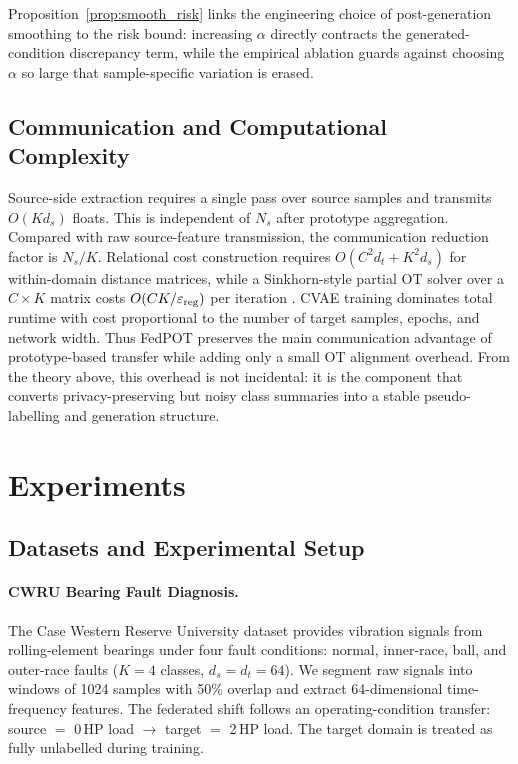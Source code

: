 \documentclass[a4paper,fleqn]{cas-sc}
\begin{document}
Proposition~\ref{prop:smooth_risk} links the engineering choice of
post-generation smoothing to the risk bound: increasing $\alpha$ directly
contracts the generated-condition discrepancy term, while the empirical
ablation guards against choosing $\alpha$ so large that sample-specific
variation is erased.

\subsection{Communication and Computational Complexity}

Source-side extraction requires a single pass over source samples and
transmits $O(Kd_s)$ floats. This is independent of $N_s$ after prototype
aggregation. Compared with raw source-feature transmission, the communication
reduction factor is $N_s/K$. Relational cost construction requires
$O(C^2d_t+K^2d_s)$ for within-domain distance matrices, while a Sinkhorn-style
partial OT solver over a $C\times K$ matrix costs $O(CK/\varepsilon_{\rm reg})$
per iteration \citep{Cuturi2013}. CVAE training dominates total runtime with
cost proportional to the number of target samples, epochs, and network width.
Thus FedPOT preserves the main communication advantage of prototype-based
transfer while adding only a small OT alignment overhead. From the theory
above, this overhead is not incidental: it is the component that converts
privacy-preserving but noisy class summaries into a stable pseudo-labelling
and generation structure.

\section{Experiments}
\label{sec:exp}

\subsection{Datasets and Experimental Setup}
\label{sec:data}

\paragraph{CWRU Bearing Fault Diagnosis.}
The Case Western Reserve University dataset \citep{Smith2015} provides
vibration signals from rolling-element bearings under four fault conditions:
normal, inner-race, ball, and outer-race faults ($K=4$ classes, $d_s=d_t=64$).
We segment raw signals into windows of 1024 samples with 50\% overlap
and extract 64-dimensional time-frequency features.
The federated shift follows an operating-condition transfer:
source $=$ 0\,HP load $\to$ target $=$ 2\,HP load.
The target domain is treated as fully unlabelled during training.
\end{document}
